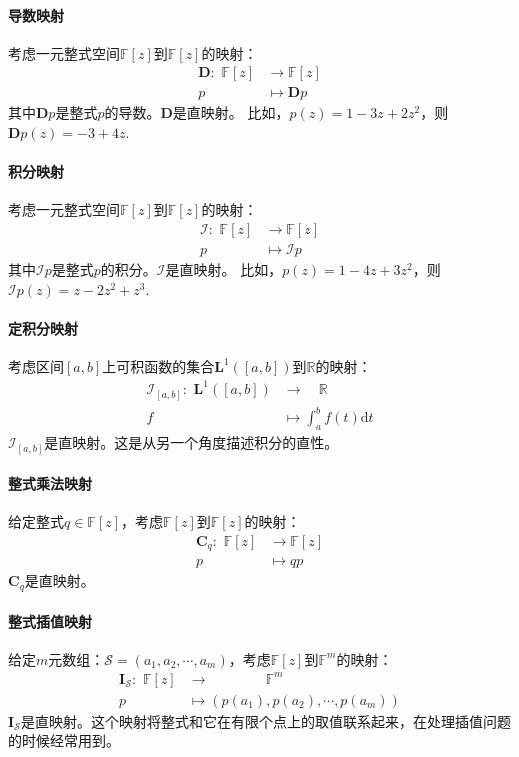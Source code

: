 \documentclass[12pt,UTF8]{ctexbook}
\begin{document}
\paragraph{导数映射} 考虑一元整式空间$\mathbb{F}[z]$到$\mathbb{F}[z]$的映射：
\begin{align*}
    \mathbf{D}: \,\, \mathbb{F}[z] & \to \mathbb{F}[z]  \\
    p & \mapsto \mathbf{D}p 
\end{align*}
其中$\mathbf{D}p$是整式$p$的导数。$\mathbf{D}$是直映射。
比如，$p(z) = 1 - 3z + 2z^2$，则$\mathbf{D}p(z) = -3 + 4z.$

\paragraph{积分映射} 考虑一元整式空间$\mathbb{F}[z]$到$\mathbb{F}[z]$的映射：
\begin{align*}
    \mathcal{I}: \,\, \mathbb{F}[z] & \to \mathbb{F}[z]  \\
    p & \mapsto \mathcal{I}p 
\end{align*}
其中$\mathcal{I}p$是整式$p$的积分。$\mathcal{I}$是直映射。
比如，$p(z) = 1 - 4z + 3z^2$，则$\mathcal{I}p(z) = z - 2z^2+ z^3.$

\paragraph{定积分映射} 考虑区间$[a,b]$上可积函数的集合$\mathbf{L}^1([a,b])$到$\mathbb{R}$的映射：
\begin{align*}
    \mathcal{I}_{[a,b]}: \,\, \mathbf{L}^1([a,b]) & \to \quad\mathbb{R}  \\
    f\quad & \mapsto \int_a^b f(t)\mathrm{d}t 
\end{align*}
$\mathcal{I}_{[a,b]}$是直映射。这是从另一个角度描述积分的直性。

\paragraph{整式乘法映射} 给定整式$q\in\mathbb{F}[z]$，考虑$\mathbb{F}[z]$到$\mathbb{F}[z]$的映射：
\begin{align*}
    \mathbf{C}_{q}: \,\, \mathbb{F}[z] & \to \mathbb{F}[z]  \\
    p\quad & \mapsto qp 
\end{align*}
$\mathbf{C}_{q}$是直映射。

\paragraph{整式插值映射} 给定$m$元数组：$\mathcal{S} = (a_1, a_2, \cdots, a_m)$，考虑$\mathbb{F}[z]$到$\mathbb{F}^m$的映射：
\begin{align*}
    \mathbf{I}_{\mathcal{S}}: \,\, \mathbb{F}[z] & \to \qquad\qquad\mathbb{F}^m  \\
    p\quad & \mapsto \left(p(a_1), p(a_2), \cdots, p(a_m)\right) 
\end{align*}
$\mathbf{I}_{\mathcal{S}}$是直映射。这个映射将整式和它在有限个点上的取值联系起来，在处理插值问题的时候经常用到。
\end{document}

